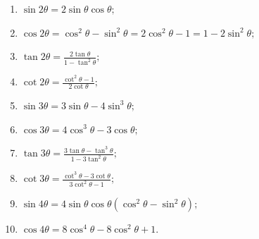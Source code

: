 \documentclass[../../main.tex]{subfiles}%
\begin{document}
\begin{theorem}[倍角公式]\label{theorem:三角函数倍角公式}
\begin{enumerate}[(1)]
\item \(\sin 2\theta = 2\sin\theta\cos\theta;\)
\item \(\cos 2\theta = \cos^2\theta - \sin^2\theta = 2\cos^2\theta - 1 = 1 - 2\sin^2\theta;\)
\item \(\tan 2\theta = \frac{2\tan\theta}{1-\tan^2\theta};\)
\item \(\cot 2\theta = \frac{\cot^2\theta - 1}{2\cot\theta};\)
\item \(\sin 3\theta = 3\sin\theta - 4\sin^3\theta;\)
\item \(\cos 3\theta = 4\cos^3\theta - 3\cos\theta;\)
\item \(\tan 3\theta = \frac{3\tan\theta - \tan^3\theta}{1 - 3\tan^2\theta};\)
\item \(\cot 3\theta = \frac{\cot^3\theta - 3\cot\theta}{3\cot^2\theta - 1};\)
\item \(\sin 4\theta = 4\sin\theta\cos\theta(\cos^2\theta - \sin^2\theta);\)
\item \(\cos 4\theta = 8\cos^4\theta - 8\cos^2\theta + 1.\)
\end{enumerate}
\end{theorem}
\end{document}
